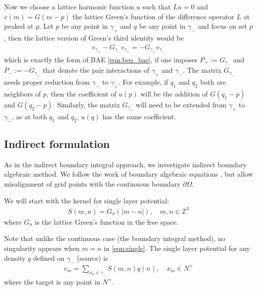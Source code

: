Now we choose a lattice harmonic function $u$ such that $Lu = 0$ and $v(m)=G(m-p)$ the lattice Green's function of the difference operator $L$ at peaked at $p$. Let $p$ be any point in $\gamma_+$ and $q$ be any point in $\gamma_-$ and focus on set $p$, then the lattice version of Green's third identity would be 
\begin{align}\label{eqn:direct_bae}
v_{\gamma_+} - G_{\gamma_-}v_{\gamma_+} = -G_{\gamma_+}v_{\gamma_-}
\end{align}
which is exactly the form of BAE \eqref{eqn:beq_bae}, if one imposes $P_+:=G_{\gamma_-}$ and $P_-:=-G_{\gamma_+}$ that denote the pair interactions of $\gamma_+$ and $\gamma_-$. The matrix $G_{\gamma_-}$ needs proper reduction from $\gamma_-$ to $\gamma_+$. For example, if $q_1$ and $q_2$ both are neighbors of $p$, then the coefficient of $u(p)$ will be the addition of $G(q_1-p)$ and $G(q_2-p)$. Similarly, the matrix $G_{\gamma_+}$ will need to be extended from $\gamma_+$ to $\gamma_-$, as at both $q_1$ and $q_2$, $u(q)$ has the same coefficient.

\subsection{Indirect formulation}
As in the indirect boundary integral approach, we investigate indirect boundary algebraic method. We follow the work of boundary algebraic equations \cite{martinsson2009boundary}, but allow misalignment of grid points with the continuous boundary $\partial\Omega$.

We will start with the kernel for single layer potential:
\begin{align}\label{eqn:single}
S(m,n) = G_\sigma(|m-n|),\quad m,n\in \mathbb{Z}^3
\end{align} 
where $G_\sigma$ is the lattice Green's function in the free space.

Note that unlike the continuous case (the boundary integral method), no singularity appears when $m=n$ in \eqref{eqn:single}. The single layer potential for any density $q$ defined on $\gamma_-$ (source) is
\begin{align}\label{eqn:single_potential}
v_m=\sum_{x_n\in\gamma_-}S(m,n)q(n),\quad x_m\in N^+
\end{align}
where the target is any point in $N^+$.

